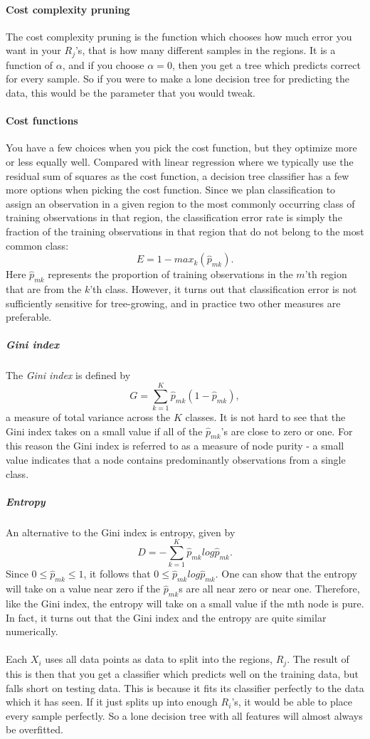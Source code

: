 \documentclass[parskip=half]{scrartcl}
\theoremstyle{definition}
\theoremstyle{remark}
\begin{document}
\paragraph{Cost complexity pruning}
The cost complexity pruning is the function which chooses how much error you want in your $R_j$'s, that is how many different samples in the regions.
It is a function of $\alpha$, and if you choose $\alpha=0$, then you get a tree which predicts correct for every sample. 
So if you were to make a lone decision tree for predicting the data, this would be the parameter that you would tweak.

\paragraph{Cost functions}
You have a few choices when you pick the cost function, but they optimize more or less equally well. Compared with linear regression where we typically use the residual sum of squares as the cost function, a decision tree classifier has a few more options when picking the cost function. 
Since we plan classification
to assign an observation in a given region to the most commonly occurring 
class of training observations in that region, the classification error rate is
simply the fraction of the training observations in that region that do not
belong to the most common class:
$$E = 1 - {max}_k(\hat{p}_{mk}).$$
Here $\hat{p}_{mk}$ represents the proportion of training observations in the $m$'th
region that are from the $k$'th class. However, it turns out that classification
error is not sufficiently sensitive for tree-growing, and in practice two other
measures are preferable.
\subparagraph{Gini index}
The \emph{Gini index} is defined by
$$
G = \sum^{K}_{k=1} \hat{p}_{mk}(1 - \hat{p}_{mk}),
$$
a measure of total variance across the $K$ classes. It is not hard to see
that the Gini index takes on a small value if all of the $\hat{p}_{mk}$'s are close to
zero or one. For this reason the Gini index is referred to as a measure of
node purity - a small value indicates that a node contains predominantly
observations from a single class.

\subparagraph{Entropy}
An alternative to the Gini index is entropy, given by
$$
D = - \sum^{K}_{k=1} \hat{p}_{mk}log\hat{p}_{mk}.
$$
Since $0 \leq \hat{p}_{mk} \leq 1$, it follows that $0 \leq \hat{p}_{mk}log\hat{p}_{mk}$. One can show that
the entropy will take on a value near zero if the $\hat{p}_{mk}$s are all near
zero or near one. Therefore, like the Gini index, the entropy will take
on a small value if the mth node is pure. In fact, it turns out that the Gini
index and the entropy are quite similar numerically.
\\
\\
Each $X_i$ uses all data points as data to split into the regions, $R_j$. The result of this is then that you get a classifier which predicts well on the training data, but falls short on testing data. This is because it fits its classifier perfectly to the data which it has seen. If it just splits up into enough $R_i$'s, it would be able to place every sample perfectly. So a lone decision tree with all features will almost always be overfitted.
\end{document}
